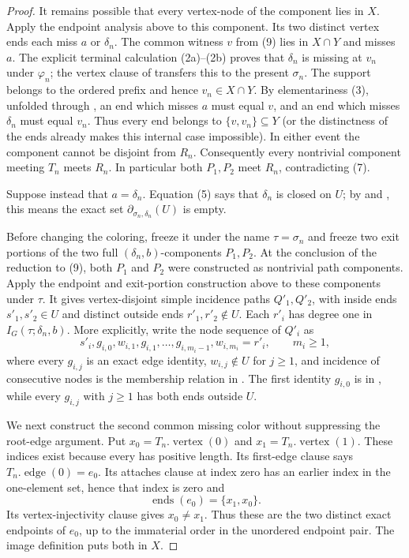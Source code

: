 \begin{proof}
It remains possible that every vertex-node of the component lies in $X$.
Apply the endpoint analysis above to this component.  Its two distinct
vertex ends each miss $a$ or $\delta_n$.  The common witness $v$ from
(9) lies in $X\cap Y$ and misses $a$.  The explicit terminal calculation
(2a)--(2b) proves that $\delta_n$ is missing at $v_n$ under $\varphi_n$;
the vertex clause of  transfers this to the
present $\sigma_n$.  The support belongs to the ordered prefix and hence
$v_n\in X\cap Y$.  By elementariness (3), unfolded through
, an end which misses $a$ must
equal $v$, and an end which misses $\delta_n$ must equal $v_n$.  Thus
every end belongs to $\{v,v_n\}\subseteq Y$ (or the distinctness of the
ends already makes this internal case impossible).  In either event the
component cannot be disjoint from $R_n$.  Consequently every
nontrivial component meeting $T_n$ meets $R_n$.  In particular both
$P_1,P_2$ meet $R_n$, contradicting (7).

  Suppose instead that $a=\delta_n$.  Equation (5) says that
  $\delta_n$ is closed on $U$; by  and
  , this means the exact set
  $\partial_{\sigma_n,\delta_n}(U)$ is empty.

  Before changing the coloring, freeze it under the name $\tau=\sigma_n$
  and freeze two exit portions of the two full
  $(\delta_n,b)$-components $P_1,P_2$.  At the conclusion of the reduction
  to (9), both $P_1$ and $P_2$ were constructed as nontrivial path
  components.  Apply the endpoint and exit-portion construction above to
  these components under $\tau$.  It gives vertex-disjoint simple incidence
  paths $Q'_1,Q'_2$, with inside ends $s'_1,s'_2\in U$ and distinct outside
  ends $r'_1,r'_2\notin U$.  Each $r'_i$ has degree one in
  $I_G(\tau;\delta_n,b)$.  More explicitly, write the node sequence of
  $Q'_i$ as
  \[
   s'_i,g_{i,0},w_{i,1},g_{i,1},\ldots,
         g_{i,m_i-1},w_{i,m_i}=r'_i,\qquad m_i\geq1,             \tag{11}
  \]
  where every $g_{i,j}$ is an exact edge identity, $w_{i,j}\notin U$
  for $j\geq1$, and incidence of consecutive nodes is the membership
  relation in .  The first identity $g_{i,0}$ is in
  , while every $g_{i,j}$ with $j\geq1$ has both
  ends outside $U$.

  We next construct the second common missing color without suppressing the
  root-edge argument.  Put
  $x_0=T_n.\operatorname{vertex}(0)$ and
  $x_1=T_n.\operatorname{vertex}(1)$.  These indices exist because every
   has positive length.  Its first-edge clause says
$T_n.\operatorname{edge}(0)=e_0$.  Its attaches clause at index zero has
an earlier index in the one-element set, hence that index is zero and
\[
                  \operatorname{ends}(e_0)=\{x_1,x_0\}.
\]
Its vertex-injectivity clause gives $x_0\ne x_1$.  Thus these are the two
distinct exact endpoints of $e_0$, up to the immaterial order in the
unordered endpoint pair.  The image definition
 puts both in $X$.


\end{proof}
